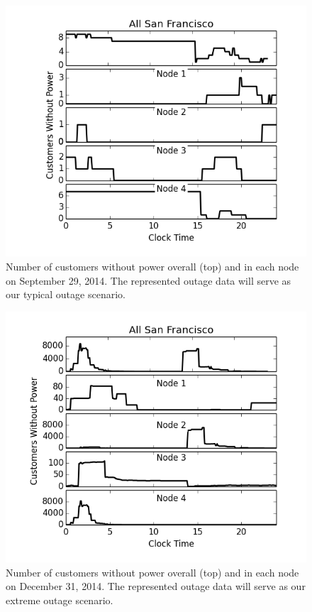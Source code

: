 \documentclass[journal]{IEEEtran}
\begin{document}
\begin{figure}[!htbp]
  \includegraphics[width=\linewidth]{plots/typical_day_2014929.png}
  \caption{Number of customers without power overall (top) and in each node on September 29, 2014. The represented outage data will serve as our typical outage scenario.}
  \label{fig:typical_day}
\end{figure}

\begin{figure}[!htbp]
  \includegraphics[width=\linewidth]{plots/extreme_day_20141231.png}
  \caption{Number of customers without power overall (top) and in each node on December 31, 2014. The represented outage data will serve as our extreme outage scenario.}
  \label{fig:extreme_day}
\end{figure}
\end{document}
